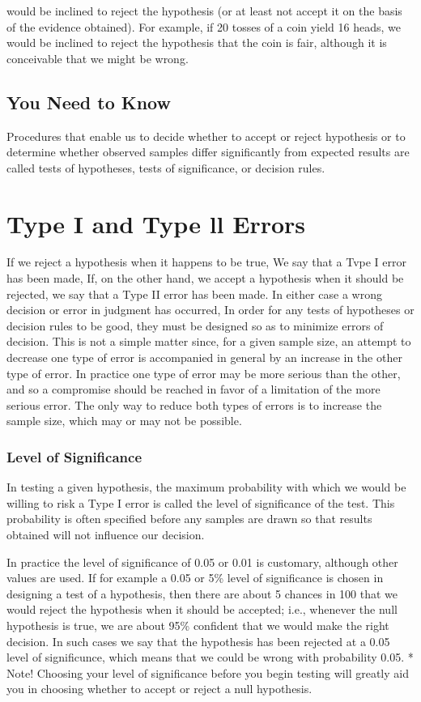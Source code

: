 would be inclined to reject the hypothesis (or at least not accept it on the
basis of the evidence obtained). For example, if 20 tosses of a coin yield 16 heads, we would be inclined to reject the hypothesis that the coin is fair, although it is conceivable that we might be wrong.
\subsection{You Need to Know}
Procedures that enable us to decide whether to accept or reject hypothesis or to determine whether observed samples
differ signiﬁcantly from expected results are called tests of
hypotheses, tests of signiﬁcance, or decision rules.
\section{Type I and Type ll Errors}
If we reject a hypothesis when it happens to be true, We say that a Tvpe
I error has been made, If, on the other hand, we accept a hypothesis
when it should be rejected, we say that a Type II error has been made.
In either case a wrong decision or error in judgment has occurred, In order for any tests of hypotheses or decision rules to be good,
they must be designed so as to minimize errors of decision. This is not
a simple matter since, for a given sample size, an attempt to decrease one type of error is accompanied in general by an increase in the other
type of error. In practice one type of error may be more serious than the other, and so a compromise should be reached in favor of a limitation of the more serious error. The only way to reduce both types of errors is to increase the sample size, which may or may not be possible.

\subsubsection{Level of Significance}
In testing a given hypothesis, the maximum probability with which we would be willing to risk a Type I error is called the level of significance of the test. This probability is often speciﬁed before any samples are drawn so that results obtained will not inﬂuence our decision.

In practice the level of signiﬁcance of 0.05 or 0.01 is customary,
although other values are used. If for example a 0.05 or 5\% level of signiﬁcance is chosen in designing a test of a hypothesis, then there are about 5 chances in 100 that we would reject the hypothesis when it should be accepted; i.e., whenever the null hypothesis is true, we are about 95\% conﬁdent that we would make the right decision. In such
cases we say that the hypothesis has been rejected at a 0.05 level of significunce, which means that we could be wrong with probability 0.05.
* Note!
Choosing your level of signiﬁcance before you begin testing
will greatly aid you in choosing whether to accept or reject a
null hypothesis.

